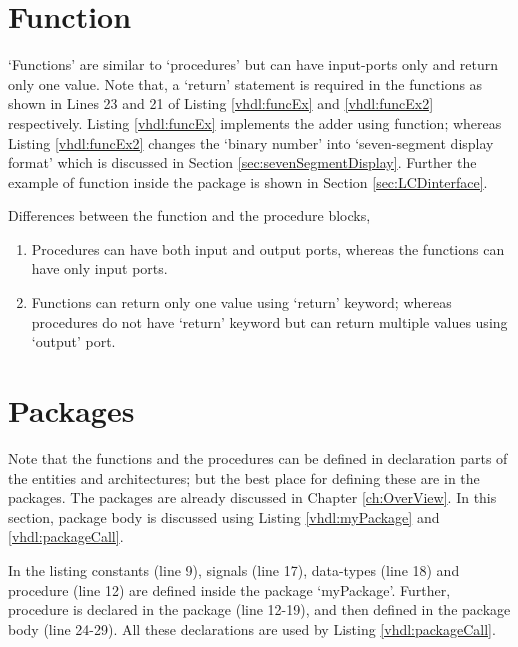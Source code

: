 



\section{Function} 
`Functions' are similar to `procedures' but can have input-ports only and return only one value. Note that, a `return' statement is required in the functions as shown in Lines 23 and 21 of Listing \ref{vhdl:funcEx} and \ref{vhdl:funcEx2} respectively. Listing \ref{vhdl:funcEx} implements the adder using function; whereas Listing \ref{vhdl:funcEx2} changes the `binary number' into `seven-segment display format' which is discussed in Section \ref{sec:sevenSegmentDisplay}. Further the example of  function inside the package is shown in Section \ref{sec:LCDinterface}. 






\begin{noNumBox}
	Differences between the function and the procedure blocks, 
	\begin{enumerate}
		\item Procedures can have both input and output ports, whereas the functions can have only input ports. 
		\item Functions can return only one value using `return' keyword; whereas procedures do not have `return' keyword but can return multiple values using `output' port.
	\end{enumerate}
\end{noNumBox}

\section{Packages}
Note that the functions and the procedures can be defined in declaration parts of the entities and architectures; but the best place for defining these are in the packages. The packages are already discussed in Chapter \ref{ch:OverView}. In this section, package body is discussed using Listing \ref{vhdl:myPackage} and \ref{vhdl:packageCall}.

\begin{explanation}
	In the listing constants (line 9), signals (line 17), data-types (line 18) and procedure (line 12) are defined inside the package `myPackage'. Further, procedure is declared in the package (line 12-19), and then defined in the package body (line 24-29). All these declarations are used by Listing \ref{vhdl:packageCall}. 
\end{explanation}

